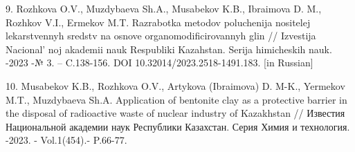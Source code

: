 \begin{references}
9. Rozhkova O.V., Muzdybaeva Sh.A., Musabekov K.B., Ibraimova D. M.,
Rozhkov V.I., Ermekov M.T. Razrabotka metodov poluchenija nositelej
lekarstvennyh sredstv na osnove organomodificirovannyh glin // Izvestija
Nacional' noj akademii nauk Respubliki Kazahstan. Serija
himicheskih nauk. -2023 -№ 3. -- C.138-156. DOI
10.32014/2023.2518-1491.183. {[}in Russian{]}

10. Musabekov K.B., Rozhkova O.V., Artykova (Ibraimova) D. M-K., Yermekov
M.T., Muzdybaeva Sh.A. Application of bentonite clay as a protective
barrier in the disposal of radioactive waste of nuclear industry of
Kazakhstan // Известия Национальной академии наук Республики Казахстан.
Серия Химия и технология. -2023. - Vol.1(454).- P.66-77.
\href{https://doi.org/10.32014/2023.2518-1491.148}{}
\end{references}

